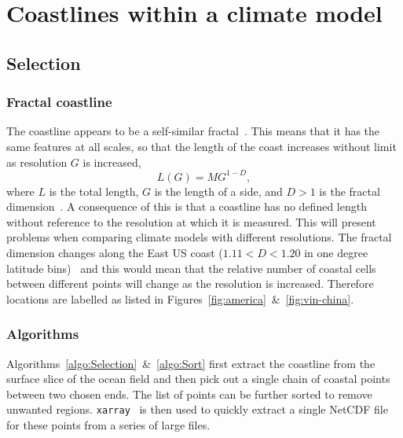 

\section{Coastlines within a climate model}
\label{sec:coast}
\subsection{Selection}
 \subsubsection{Fractal coastline}
 \label{sec:fractal}
 The coastline appears to be a self-similar fractal~\cite{mandelbrot1967long,
 richardson1961problem}. This means that it has the same features at all
 scales, so that the length of the coast increases without limit as resolution $G$
 is increased,
 \begin{equation}
 L(G)=M G^{1-D},
 \end{equation}
 where $L$ is the total length, $G$ is the length of a side,
 and $D>1$ is the fractal dimension~\cite{mandelbrot1967long}.
 A consequence of this is that a coastline has no defined length without
 reference to the resolution at which it is measured.
 This will present problems when comparing
 climate models with different resolutions.
 The fractal dimension changes
  along the East US coast ($1.11<D<1.20$ in one degree latitude bins)~\cite{jiang1998fractal}
 and this would mean that the relative number of coastal cells between different
 points will change as the resolution is increased.
 Therefore locations are labelled as listed in
 Figures~\ref{fig:america}~\&~\ref{fig:vin-china}.

\subsubsection{Algorithms}
\label{sec:coast-algorithms}
Algorithms~\ref{algo:Selection}~\&~\ref{algo:Sort} first extract the coastline
from the surface slice of the ocean field and then pick out a single chain of
coastal points between two chosen ends. The list of points can be further
sorted to remove unwanted regions.
\texttt{xarray}~\cite{hoyer2017xarray} is then used to quickly extract
a single NetCDF file for these points from a series of large files.





